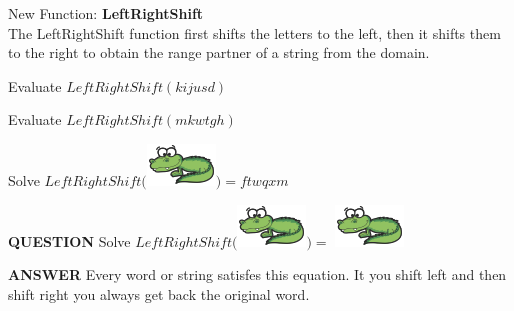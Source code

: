 \documentclass{ximera}
\begin{document}
\begin{exploration}
New Function: \textbf{LeftRightShift}\\
The LeftRightShift function first shifts the letters to the left, then it shifts them to the right to obtain the range partner of a string from the domain.
\quad \\


\begin{question}
Evaluate $LeftRightShift(kijusd)$
\begin{multipleChoice}
\end{multipleChoice}
\end{question}





\begin{question}
Evaluate $LeftRightShift(mkwtgh)$
\begin{multipleChoice}
\end{multipleChoice}
\end{question}




\begin{question}
Solve $LeftRightShift($\includegraphics{pics/alligator.png}$) = ftwqxm$
\begin{multipleChoice}
\end{multipleChoice}
\end{question}





\begin{dialogue}
\item[\textbf{QUESTION}] Solve $LeftRightShift($\includegraphics{pics/alligator.png}$ ) = $ \includegraphics{pics/alligator.png}
\item[\textbf{ANSWER}] Every word or string satisfes this equation.  It you shift left and then shift right you always get back the original word.
\end{dialogue}

\end{exploration}
\end{document}
